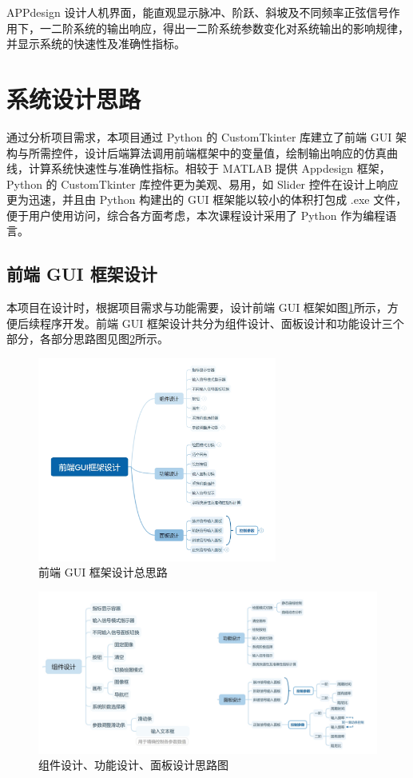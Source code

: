 \documentclass[12pt]{ctexart}
\begin{document}
APPdesign 设计人机界面，能直观显示脉冲、阶跃、斜坡及不同频率正弦信号作用下，一二阶系统的输出响应，得出一二阶系统参数变化对系统输出的影响规律，并显示系统的快速性及准确性指标。

\section{系统设计思路}

通过分析项目需求，本项目通过 Python 的 CustomTkinter 库建立了前端 GUI 架构与所需控件，设计后端算法调用前端框架中的变量值，绘制输出响应的仿真曲线，计算系统快速性与准确性指标。相较于 MATLAB 提供 Appdesign 框架，Python 的 CustomTkinter 库控件更为美观、易用，如 Slider 控件在设计上响应更为迅速，并且由 Python 构建出的 GUI 框架能以较小的体积打包成 .exe 文件，便于用户使用访问，综合各方面考虑，本次课程设计采用了 Python 作为编程语言。

\subsection{前端 GUI 框架设计}

本项目在设计时，根据项目需求与功能需要，设计前端 GUI 框架如图\ref{figure1}所示，方便后续程序开发。前端 GUI 框架设计共分为组件设计、面板设计和功能设计三个部分，各部分思路图见图\ref{figure2}所示。

\begin{figure}[htbp]
    \centering
    \includegraphics[width=0.7\textwidth]{img/major_framework.png}
    \caption{前端 GUI 框架设计总思路}\label{figure1}
\end{figure}
\begin{figure}[htbp]
    \centering
    \includegraphics[width=\textwidth]{img/word_align.png}
    \caption{组件设计、功能设计、面板设计思路图}\label{figure2}
\end{figure}
\end{document}
